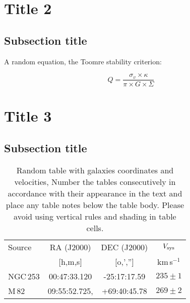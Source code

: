\documentclass[final,5p,times,twocolumn]{elsarticle}
\newcommand{\kms}{km\,s$^{-1}$}
\begin{document}



\section{Title 2}
\lipsum[1]

\subsection{Subsection title}

A random equation, the Toomre stability criterion:

\begin{equation}
    Q = \frac{\sigma_v \times \kappa}{\pi \times G \times \Sigma}
\end{equation}

\section{Title 3}
\lipsum[2]

\subsection{Subsection title}
\lipsum[3]

\begin{table}
\begin{tabular}{l c c c} 
 \hline
 Source & RA (J2000) & DEC (J2000) & $V_{\rm sys}$ \\ 
        & [h,m,s]    & [o,','']    & \kms          \\
 \hline
 NGC\,253 & 	00:47:33.120 & -25:17:17.59 & $235 \pm 1$ \\ 
 M\,82 & 09:55:52.725, & +69:40:45.78 & $269 \pm 2$ 	 \\ 
 \hline
\end{tabular}
\caption{Random table with galaxies coordinates and velocities, Number the tables consecutively in
accordance with their appearance in the text and place any table notes below the table body. Please avoid using vertical rules and shading in table cells.
}
\label{Table1}
\end{table}
\end{document}
